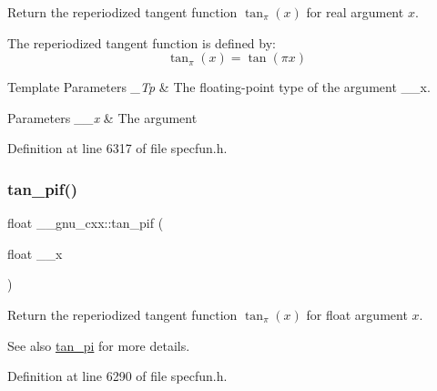 Return the reperiodized tangent function $ \tan_\pi(x) $ for real argument $ x $.

The reperiodized tangent function is defined by\+: \[ \tan_\pi(x) = \tan(\pi x) \]


\begin{DoxyTemplParams}{Template Parameters}
{\em \+\_\+\+Tp} & The floating-\/point type of the argument {\ttfamily \+\_\+\+\_\+x}. \\
\hline
\end{DoxyTemplParams}

\begin{DoxyParams}{Parameters}
{\em \+\_\+\+\_\+x} & The argument \\
\hline
\end{DoxyParams}


Definition at line 6317 of file specfun.\+h.

\mbox{\label{group__gnu__math__spec__func_gaab32e2d76da811451e84232320ddf80c}} 
\subsubsection{\texorpdfstring{tan\+\_\+pif()}{tan\_pif()}}
{\footnotesize\ttfamily float \+\_\+\+\_\+gnu\+\_\+cxx\+::tan\+\_\+pif (\begin{DoxyParamCaption}\item[{float}]{\+\_\+\+\_\+x }\end{DoxyParamCaption})\hspace{0.3cm}{\ttfamily [inline]}}

Return the reperiodized tangent function $ \tan_\pi(x) $ for {\ttfamily float} argument $ x $.

\begin{DoxySeeAlso}{See also}
\hyperlink{group__gnu__math__spec__func_ga12855bd62fe6a955ef0d1d5e92c85ba9}{tan\+\_\+pi} for more details. 
\end{DoxySeeAlso}


Definition at line 6290 of file specfun.\+h.

\mbox{\label{group__gnu__math__spec__func_ga3546906a5bb8f128c893dddef72e2f20}} 
